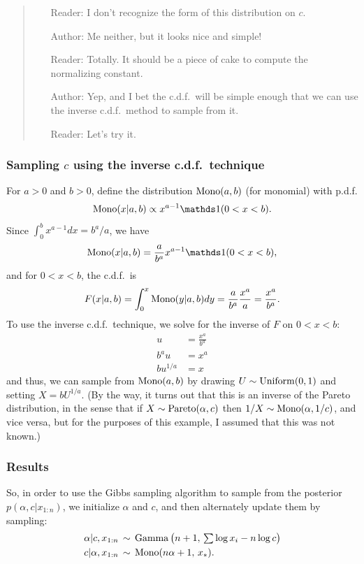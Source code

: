 \documentclass[12pt]{article}
\begin{document}
\begin{quote}
\it
\begin{itemize}
\item[Reader:] I don't recognize the form of this distribution on $c$.
\item[Author:] Me neither, but it looks nice and simple!
\item[Reader:] Totally. It should be a piece of cake to compute the normalizing constant.
\item[Author:] Yep, and I bet the c.d.f.\ will be simple enough that we can use the inverse c.d.f.\ method to sample from it.
\item[Reader:] Let's try it.
\end{itemize}
\end{quote}

\subsubsection{Sampling $c$ using the inverse c.d.f.\ technique}
For $a>0$ and $b>0$, define the distribution $\operatorname*{Mono}(a,b)$ (for monomial) with p.d.f.
$$ \Mono(x|a,b)\propto x^{a-1}\I(0<x<b). $$
Since $\int_0^b x^{a -1}d x = b^a/a$, we have
$$ \Mono(x|a,b) =\frac{a}{b^a}x^{a-1}\I(0<x<b), $$
and for $0<x<b$, the c.d.f.\ is
$$ F(x|a,b) =\int_0^x \operatorname*{Mono}(y|a,b)d y = \frac{a}{b^a}\frac{x^a}{a} = \frac{x^a}{b^a}. $$
To use the inverse c.d.f.\ technique, we solve for the inverse of $F$ on $0<x<b$:
\begin{align*}
u &= \frac{x^a}{b^a} \\
b^a u &= x^a \\ 
b u^{1/a} &= x 
\end{align*}
and thus, we can sample from $\operatorname*{Mono}(a,b)$ by drawing $U\sim \operatorname*{Uniform}(0,1)$ and setting $X=b U^{1/a}$.
(By the way, it turns out that this is an inverse of the Pareto distribution, in the sense that if $X\sim\operatorname*{Pareto}(\alpha,c)$ then $1/X\sim\operatorname*{Mono}(\alpha,1/c)$, and vice versa, but for the purposes of this example, I assumed that this was not known.)

\subsubsection{Results}
So, in order to use the Gibbs sampling algorithm to sample from the posterior $p(\alpha,c|x_{1:n})$, we initialize $\alpha$ and $c$, and then alternately update them by sampling:
\begin{align*}
\alpha|c,x_{1:n} \,&\sim\, \operatorname*{Gamma}\big(n+1,\,\textstyle\sum\log x_i - n\log c\big) \\
c|\alpha,x_{1:n}\,&\sim\, \operatorname*{Mono}(n\alpha+1,\,x_*).
\end{align*}
\end{document}

